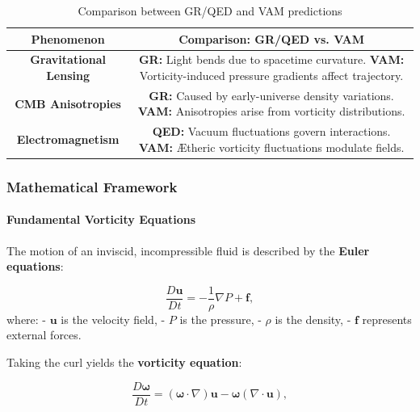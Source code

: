 \documentclass[a4paper,10pt]{article}
\renewcommand{\arraystretch}{1.5}
\begin{document}
\begin{table}[h]
    \centering
    \renewcommand{\arraystretch}{1.3}
    \begin{tabular}{|c|c|}
        \hline
        \textbf{Phenomenon} & \textbf{Comparison: GR/QED vs. VAM} \\
        \hline
        \textbf{Gravitational Lensing} &
        \textbf{GR:} Light bends due to spacetime curvature. \newline
        \textbf{VAM:} Vorticity-induced pressure gradients affect trajectory. \\
        \hline
        \textbf{CMB Anisotropies} &
        \textbf{GR:} Caused by early-universe density variations. \newline
        \textbf{VAM:} Anisotropies arise from vorticity distributions. \\
        \hline
        \textbf{Electromagnetism} &
        \textbf{QED:} Vacuum fluctuations govern interactions. \newline
        \textbf{VAM:} Ætheric vorticity fluctuations modulate fields. \\
        \hline
    \end{tabular}

    \caption{Comparison between GR/QED and VAM predictions}
    \label{tab:comparison}
\end{table}


    \subsubsection*{Mathematical Framework}

    \paragraph*{Fundamental Vorticity Equations}
    The motion of an inviscid, incompressible fluid is described by the \textbf{Euler equations}:

    \begin{equation*}
        \frac{D\boldsymbol{u}}{Dt} = -\frac{1}{\rho} \nabla P + \boldsymbol{f},
    \end{equation*}
    where:
    - \( \boldsymbol{u} \) is the velocity field,
    - \( P \) is the pressure,
    - \( \rho \) is the density,
    - \( \boldsymbol{f} \) represents external forces.

    Taking the curl yields the \textbf{vorticity equation}:

    \begin{equation*}
        \frac{D\boldsymbol{\omega}}{Dt} = (\boldsymbol{\omega} \cdot \nabla) \boldsymbol{u} - \boldsymbol{\omega} (\nabla \cdot \boldsymbol{u}),
    \end{equation*}
\end{document}
